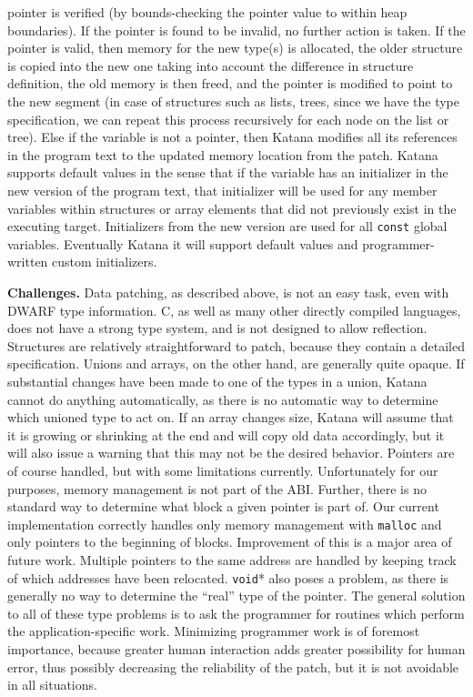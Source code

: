 pointer is verified (by bounds-checking the pointer value to within
heap boundaries).  If the pointer is found to be invalid, no further
action is taken.  If the pointer is valid, then memory for the new
type(s) is allocated, the older structure is copied into the new one
taking into account the difference in structure definition, the old
memory is then freed, and the pointer is modified to point to the new
segment (in case of structures such as lists, trees, since we have the
type specification, we can repeat this process recursively for each
node on the list or tree). Else if the variable is not a pointer, then
Katana modifies all its references in the program text to the updated
memory location from the patch. Katana supports default values in the
sense that if the variable has an initializer in the new version of
the program text, that initializer will be used for any member
variables within structures or array elements that did not
previously exist in the executing target. Initializers from the new
version are used for all \texttt{const} global variables.
Eventually Katana it will support default values and programmer-written
custom initializers.

{\bf Challenges.} %
Data patching, as described above, is not an easy task, even with
DWARF type information. C, as well as many other directly compiled
languages, does not have a strong type system, and is not designed to
allow reflection. Structures are relatively straightforward to patch,
because they contain a detailed specification. Unions and arrays, on
the other hand, are generally quite opaque. If substantial changes
have been made to one of the types in a union, Katana cannot do
anything automatically, as there is no automatic way to determine
which unioned type to act on. If an array changes size, Katana will
assume that it is growing or shrinking at the end and will copy old data
accordingly, but it will also issue a warning that this may not be the desired
behavior. Pointers are of course handled, but with some limitations
currently. Unfortunately for our purposes, memory management is not
part of the ABI. Further, there is no standard way to determine what
block a given pointer is part of. Our current implementation correctly
handles only memory management with \texttt{malloc} and only pointers to the
beginning of blocks. Improvement of this is a major area of future
work. Multiple pointers to the same address are handled by keeping track
of which addresses have been relocated. \texttt{void}* also poses a
problem, as there is generally no way to determine the ``real'' type
of the pointer. The general solution to all of these type problems is
to ask the programmer for routines which perform the
application-specific work. Minimizing programmer work is of foremost
importance, because greater human interaction adds greater possibility
for human error, thus possibly decreasing the reliability of the
patch, but it is not avoidable in all situations.

